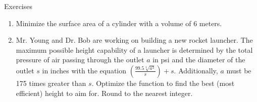 \documentclass[../revisedmain.tex]{subfiles}
\begin{document}
	\begin{center}
		\LARGE Exercises
	\end{center}
	\begin{enumerate}
		\item Minimize the surface area of a cylinder with a volume of 6 meters.
		\item Mr. Young and Dr. Bob are working on building a new rocket launcher. The maximum possible height capability of a launcher is determined by the total pressure of air passing through the outlet $a$ in psi and the diameter of the outlet $s$ in inches with the equation $\left(\displaystyle\frac{99.5\sqrt[4]{a^3}}{s}\right)+s$. Additionally, $a$ must be 175 times greater than $s$. Optimize the function to find the best (most efficient) height to aim for. Round to the nearest integer. 
	\end{enumerate}
\end{document}
